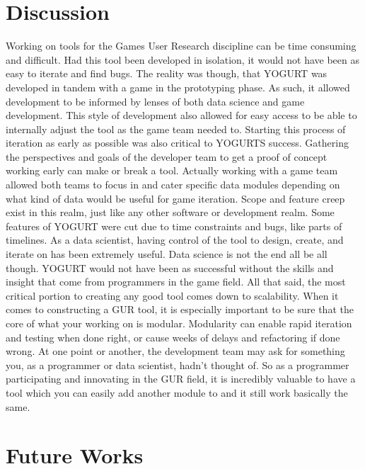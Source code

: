 \documentclass[journal]{IEEEtran}
\begin{document}
\section{Discussion}

Working on tools for the Games User Research discipline can be time consuming and difficult. Had this tool been developed in isolation, it would not have been as easy to iterate and find bugs. The reality was though, that YOGURT was developed in tandem with a game in the prototyping phase. As such, it allowed development to be informed by lenses of both data science and game development. This style of development also allowed for easy access to be able to internally adjust the tool as the game team needed to.
Starting this process of iteration as early as possible was also critical to YOGURTS success. Gathering the perspectives and goals of the developer team to get a proof of concept working early can make or break a tool. Actually working with a game team allowed both teams to focus in and cater specific data modules depending on what kind of data would be useful for game iteration. Scope and feature creep exist in this realm, just like any other software or development realm. Some features of YOGURT were cut due to time constraints and bugs, like parts of timelines. As a data scientist, having control of the tool to design, create, and iterate on has been extremely useful. Data science is not the end all be all though. YOGURT would not have been as successful without the skills and insight that come from programmers in the game field.
All that said, the most critical portion to creating any good tool comes down to scalability. When it comes to constructing a GUR tool, it is especially important to be sure that the core of what your working on is modular. Modularity can enable rapid iteration and testing when done right, or cause weeks of delays and refactoring if done wrong. At one point or another, the development team may ask for something you, as a programmer or data scientist, hadn’t thought of. So as a programmer participating and innovating in the GUR field, it is incredibly valuable to have a tool which you can easily add another module to and it still work basically the same.

\section{Future Works}
\end{document}

